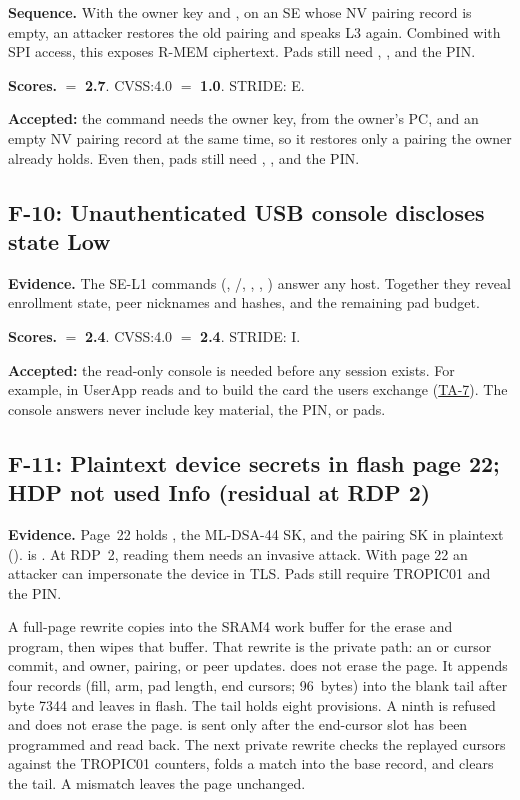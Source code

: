 \documentclass[11pt,a4paper]{article}
\newcommand{\sev}[1]{\textbf{#1}}
\begin{document}
\textbf{Sequence.} With the owner key and , on an SE whose NV pairing record is empty, an attacker restores the old pairing and speaks L3 again. Combined with SPI access, this exposes R-MEM ciphertext. Pads still need , , and the PIN.

\textbf{Scores.}  $=$ \textbf{2.7}. CVSS:4.0 $=$ \textbf{1.0}. STRIDE: E.

\textbf{Accepted:} the command needs the owner key,  from the owner's PC, and an empty NV pairing record at the same time, so it restores only a pairing the owner already holds. Even then, pads still need , , and the PIN.

\subsection*{F-10: Unauthenticated USB console discloses state \hfill \sev{Low}}\label{f:F-10}
\textbf{Evidence.} The SE-L1 commands (, /, , , ) answer any host. Together they reveal enrollment state, peer nicknames and hashes, and the remaining pad budget.

\textbf{Scores.}  $=$ \textbf{2.4}. CVSS:4.0 $=$ \textbf{2.4}. STRIDE: I.

\textbf{Accepted:} the read-only console is needed before any session exists. For example,  in UserApp reads  and  to build the card the users exchange (\hyperref[ta:TA-7]{TA-7}). The console answers never include key material, the PIN, or pads.

\subsection*{F-11: Plaintext device secrets in flash page 22; HDP not used \hfill \sev{Info (residual at RDP 2)}}\label{f:F-11}
\textbf{Evidence.} Page~22 holds , the ML-DSA-44 SK, and the pairing SK in plaintext ().  is . At RDP~2, reading them needs an invasive attack. With page 22 an attacker can impersonate the device in TLS. Pads still require TROPIC01 and the PIN.

A full-page rewrite copies  into the SRAM4 work buffer for the erase and program, then wipes that buffer. That rewrite is the private path: an  or  cursor commit, and owner, pairing, or peer updates.  does not erase the page. It appends four records (fill, arm, pad length, end cursors; 96~bytes) into the blank tail after byte 7344 and leaves  in flash. The tail holds eight provisions. A ninth is refused and does not erase the page.  is sent only after the end-cursor slot has been programmed and read back. The next private rewrite checks the replayed cursors against the TROPIC01 counters, folds a match into the base record, and clears the tail. A mismatch leaves the page unchanged.
\end{document}
